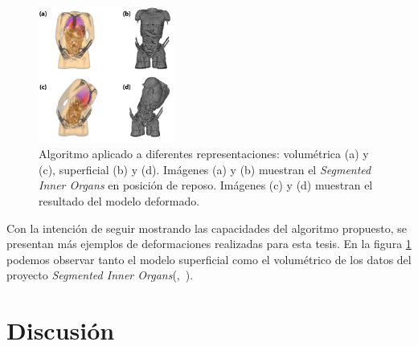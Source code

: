 \begin{figure}[!ht]%
   \centering
   \includegraphics[width=0.4\textwidth]{IMG/HV}
    \caption{Algoritmo aplicado a diferentes representaciones: volumétrica (a) y (c), superficial (b) y (d). Imágenes (a) y (b) muestran el \emph{Segmented Inner Organs} en posición de reposo. Imágenes (c) y (d) muestran el resultado del modelo deformado.}
    \label{fig:humanvisible}
\end{figure}
Con la intención de seguir mostrando las capacidades del algoritmo propuesto, se presentan más ejemplos de deformaciones realizadas para esta tesis. En la figura \ref{fig:humanvisible} podemos observar tanto el modelo superficial como el volumétrico de los datos del proyecto \emph{Segmented Inner Organs}(\cite{VM2002},~\cite{VoxelMan}).












\section{Discusión}
\label{posing:discusion}


